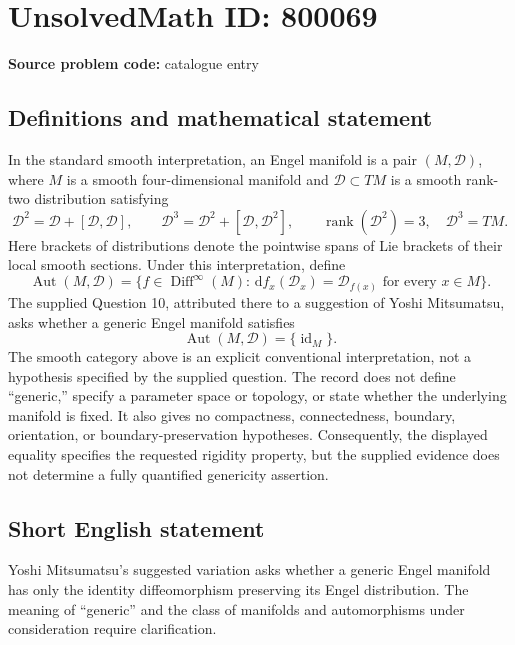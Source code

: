 \documentclass[11pt]{article}
\newcommand{\dd}{\,\mathrm{d}}
\begin{document}
\section*{UnsolvedMath ID: 800069}
\textbf{Source problem code:} catalogue entry
\subsection{Definitions and mathematical statement}
In the standard smooth interpretation, an Engel manifold is a pair \((M,\mathcal D)\), where \(M\) is a smooth four-dimensional manifold and \(\mathcal D\subset TM\) is a smooth rank-two distribution satisfying
\[
\mathcal D^2=\mathcal D+[\mathcal D,\mathcal D],\qquad
\mathcal D^3=\mathcal D^2+[\mathcal D,\mathcal D^2],\qquad
\operatorname{rank}(\mathcal D^2)=3,\quad \mathcal D^3=TM.
\]
Here brackets of distributions denote the pointwise spans of Lie brackets of their local smooth sections. Under this interpretation, define
\[
\operatorname{Aut}(M,\mathcal D)
=\{f\in\operatorname{Diff}^{\infty}(M):
\dd f_x(\mathcal D_x)=\mathcal D_{f(x)}\text{ for every }x\in M\}.
\]
The supplied Question 10, attributed there to a suggestion of Yoshi Mitsumatsu, asks whether a generic Engel manifold satisfies
\[
\operatorname{Aut}(M,\mathcal D)=\{\operatorname{id}_M\}.
\]
The smooth category above is an explicit conventional interpretation, not a hypothesis specified by the supplied question. The record does not define ``generic,'' specify a parameter space or topology, or state whether the underlying manifold is fixed. It also gives no compactness, connectedness, boundary, orientation, or boundary-preservation hypotheses. Consequently, the displayed equality specifies the requested rigidity property, but the supplied evidence does not determine a fully quantified genericity assertion.
\subsection{Short English statement}
Yoshi Mitsumatsu's suggested variation asks whether a generic Engel manifold has only the identity diffeomorphism preserving its Engel distribution. The meaning of ``generic'' and the class of manifolds and automorphisms under consideration require clarification.
\end{document}
